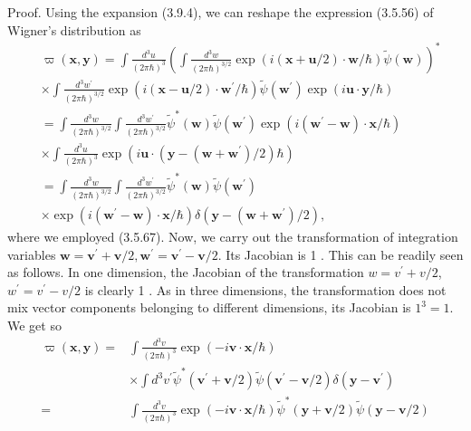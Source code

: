 \documentclass{article}
\begin{document}
Proof. Using the expansion (3.9.4), we can reshape the expression (3.5.56) of Wigner's distribution as
$$
\begin{align*}
& \varpi(\boldsymbol{x}, \boldsymbol{y})=\int \frac{d^{3} u}{(2 \pi \hbar)^{3}}\left(\int \frac{d^{3} w}{(2 \pi \hbar)^{3 / 2}} \exp (i(\boldsymbol{x}+\boldsymbol{u} / 2) \cdot \boldsymbol{w} / \hbar) \tilde{\psi}(\boldsymbol{w})\right)^{*}  \tag{3.9.32}\\
& \times \int \frac{d^{3} w^{\prime}}{(2 \pi \hbar)^{3 / 2}} \exp \left(i(\boldsymbol{x}-\boldsymbol{u} / 2) \cdot \boldsymbol{w}^{\prime} / \hbar\right) \tilde{\psi}\left(\boldsymbol{w}^{\prime}\right) \exp (i \boldsymbol{u} \cdot \boldsymbol{y} / \hbar) \\
& =\int \frac{d^{3} w}{(2 \pi \hbar)^{3 / 2}} \int \frac{d^{3} w^{\prime}}{(2 \pi \hbar)^{3 / 2}} \tilde{\psi}^{*}(\boldsymbol{w}) \tilde{\psi}\left(\boldsymbol{w}^{\prime}\right) \exp \left(i\left(\boldsymbol{w}^{\prime}-\boldsymbol{w}\right) \cdot \boldsymbol{x} / \hbar\right) \\
& \times \int \frac{d^{3} u}{(2 \pi \hbar)^{3}} \exp \left(i \boldsymbol{u} \cdot\left(\boldsymbol{y}-\left(\boldsymbol{w}+\boldsymbol{w}^{\prime}\right) / 2\right) \hbar\right) \\
& =\int \frac{d^{3} w}{(2 \pi \hbar)^{3 / 2}} \int \frac{d^{3} w^{\prime}}{(2 \pi \hbar)^{3 / 2}} \tilde{\psi}^{*}(\boldsymbol{w}) \tilde{\psi}\left(\boldsymbol{w}^{\prime}\right) \\
& \times \exp \left(i\left(\boldsymbol{w}^{\prime}-\boldsymbol{w}\right) \cdot \boldsymbol{x} / \hbar\right) \delta\left(\boldsymbol{y}-\left(\boldsymbol{w}+\boldsymbol{w}^{\prime}\right) / 2\right),
\end{align*}
$$
where we employed (3.5.67). Now, we carry out the transformation of integration variables $\boldsymbol{w}=\boldsymbol{v}^{\prime}+\boldsymbol{v} / 2, \boldsymbol{w}^{\prime}=\boldsymbol{v}^{\prime}-\boldsymbol{v} / 2$. Its Jacobian is 1 . This can be readily seen as follows. In one dimension, the Jacobian of the transformation $w=v^{\prime}+v / 2$, $w^{\prime}=v^{\prime}-v / 2$ is clearly 1 . As in three dimensions, the transformation does not mix vector components belonging to different dimensions, its Jacobian is $1^{3}=1$. We get so
$$
\begin{align*}
\varpi(\boldsymbol{x}, \boldsymbol{y})= & \int \frac{d^{3} v}{(2 \pi \hbar)^{3}} \exp (-i \boldsymbol{v} \cdot \boldsymbol{x} / \hbar)  \tag{3.9.33}\\
& \times \int d^{3} v^{\prime} \tilde{\psi}^{*}\left(\boldsymbol{v}^{\prime}+\boldsymbol{v} / 2\right) \tilde{\psi}\left(\boldsymbol{v}^{\prime}-\boldsymbol{v} / 2\right) \delta\left(\boldsymbol{y}-\boldsymbol{v}^{\prime}\right) \\
= & \int \frac{d^{3} v}{(2 \pi \hbar)^{3}} \exp (-i \boldsymbol{v} \cdot \boldsymbol{x} / \hbar) \tilde{\psi}^{*}(\boldsymbol{y}+\boldsymbol{v} / 2) \tilde{\psi}(\boldsymbol{y}-\boldsymbol{v} / 2)
\end{align*}
$$
\end{document}

